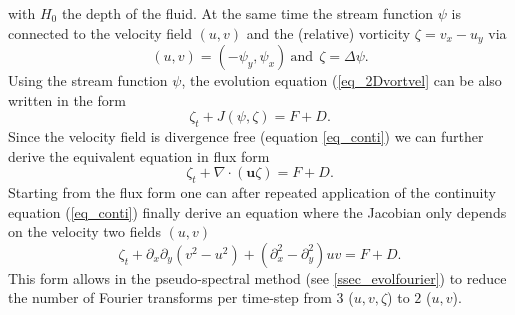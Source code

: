with $H_{0}$ the depth of the fluid. At the same time
the stream function $\psi$ is connected to the velocity 
field $(u,v)$ and the (relative) 
vorticity $\zeta = v_{x} - u_{y}$ via
\begin{equation} \label{eq_psiuv}
  (u,v) = (- \psi_{y},\psi_{x}) \ \mbox{and} \ \ \zeta = \Delta \psi.
\end{equation}
Using the stream function $\psi$, the evolution equation (\ref{eq_2Dvortvel}
can be also written in the form
\begin{equation} \label{eq_2Dvortstream}
  \zeta_{t} + J(\psi,\zeta) = F + D.
\end{equation}
Since the velocity field is divergence free (equation \ref{eq_conti})
we can further derive the equivalent equation in flux form
\begin{equation} \label{eq_2Dflux}
  \zeta_{t} + \nabla \cdot \left(\mathbf{u} \zeta \right) = F + D.
\end{equation}
Starting from the flux form one can after repeated application of the
continuity equation (\ref{eq_conti}) finally derive an equation where
the Jacobian only depends on the velocity two fields $(u,v)$
\begin{equation} \label{eq_2Duv}
  \zeta_{t} 
   + \partial_{x} \partial_{y} \left( v^{2} - u^{2} \right) 
   + \left(\partial^{2}_{x} - \partial^{2}_{y} \right) uv
   = 
  F + D.
\end{equation}
This form allows in the pseudo-spectral method (see \ref{ssec_evolfourier}) 
to reduce the number of Fourier transforms per time-step from 
$3$ ($u,v,\zeta$) to $2$ ($u,v$).  

